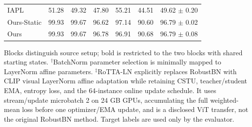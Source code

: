 \begin{table}[t]
{\begin{tabular}{lcccccc}
IAPL & 51.28 & 49.32 & 47.80 & 55.21 & 44.51 & 49.62 $\pm$ 0.20 \\
Ours-Static & 99.93 & 99.67 & 96.62 & 97.14 & 90.60 & 96.79 $\pm$ 0.02 \\
Ours & 99.93 & 99.67 & 96.78 & 96.91 & 90.68 & 96.79 $\pm$ 0.08 \\
\bottomrule
\end{tabular}%
}
\vspace{2pt}
\parbox{\textwidth}{\footnotesize Blocks distinguish source setup; bold is restricted to the two blocks with shared starting states. $^{\dagger}$BatchNorm parameter selection is minimally mapped to LayerNorm affine parameters. $^{\ddagger}$RoTTA-LN explicitly replaces RobustBN with CLIP visual LayerNorm affine adaptation while retaining CSTU, teacher/student EMA, entropy loss, and the 64-instance online update schedule. It uses stream/update microbatch 2 on 24 GB GPUs, accumulating the full weighted-mean loss before one optimizer/EMA update, and is a disclosed ViT transfer, not the original RobustBN method. Target labels are used only by the evaluator.}
\end{table}
